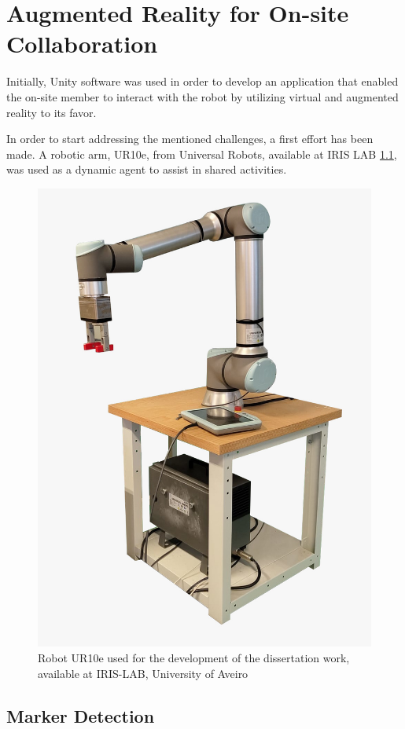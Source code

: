 \chapter{Augmented Reality for On-site Collaboration}%
\label{chapter:on-site}



Initially, Unity software was used in order to develop an application that enabled the on-site member to interact with the robot by utilizing 
virtual and augmented reality to its favor.  


In order to start addressing the mentioned challenges, a first effort has been made. A robotic arm, UR10e, from Universal Robots, 
available at IRIS LAB \ref{f:ur10e_iris}, was used as a dynamic agent to assist in shared activities.

\begin{figure}[h]
    \centering
    \includegraphics[width=0.4\linewidth]{figs/ur10e.jpeg}
    \caption{Robot UR10e used for the development of the dissertation work, available at IRIS-LAB, University of Aveiro}
    \label{f:ur10e_iris}
\end{figure}

\section{Marker Detection}
\label{section:marker-detection}


